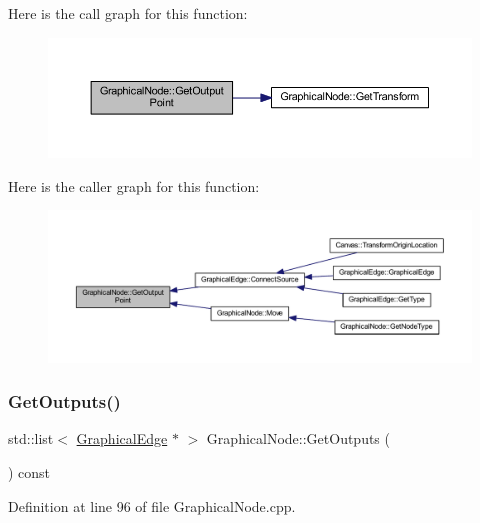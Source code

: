 Here is the call graph for this function\+:
\nopagebreak
\begin{figure}[H]
\begin{center}
\leavevmode
\includegraphics[width=350pt]{class_graphical_node_a5e0a98450d511bb024e1746ab42d34c4_cgraph}
\end{center}
\end{figure}
Here is the caller graph for this function\+:
\nopagebreak
\begin{figure}[H]
\begin{center}
\leavevmode
\includegraphics[width=350pt]{class_graphical_node_a5e0a98450d511bb024e1746ab42d34c4_icgraph}
\end{center}
\end{figure}
\mbox{\label{class_graphical_node_a2d4169669b106f7351178e4fbc60be85}} 
\subsubsection{\texorpdfstring{Get\+Outputs()}{GetOutputs()}}
{\footnotesize\ttfamily std\+::list$<$ \hyperlink{class_graphical_edge}{Graphical\+Edge} $\ast$ $>$ Graphical\+Node\+::\+Get\+Outputs (\begin{DoxyParamCaption}{ }\end{DoxyParamCaption}) const}



Definition at line 96 of file Graphical\+Node.\+cpp.

